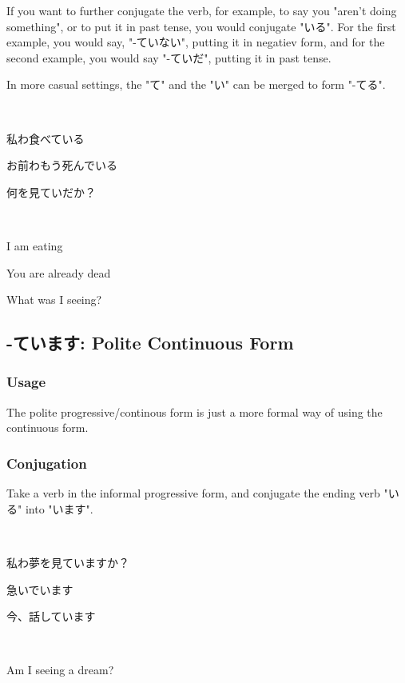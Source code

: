 \documentclass{article}
\begin{document}
\begin{CJK}{UTF8}{min}
If you want to further conjugate the verb, for example, to say you "aren't doing something", or to put it in past tense, you would conjugate "いる". For the first example, you would say, "-ていない", putting it in negatiev form, and for the second example, you would say "-ていだ", putting it in past tense.

In more casual settings, the "て" and the "い" can be merged to form "-てる".
\begin{example}
\ 

私わ食べている

お前わもう死んでいる

何を見ていだか？

\end{example}

\begin{solution}
\ 

I am eating

You are already dead

What was I seeing?
\end{solution}

\subsection{-ています: Polite Continuous Form}

\subsubsection{Usage}

The polite progressive/continous form is just a more formal way of using the continuous form.

\subsubsection{Conjugation}

Take a verb in the informal progressive form, and conjugate the ending verb "いる" into "います".

\begin{example}
\ 

私わ夢を見ていますか？

急いでいます

今、話しています

\end{example}

\begin{solution}
\ 

Am I seeing a dream?


\end{solution}
\end{CJK}
\end{document}
